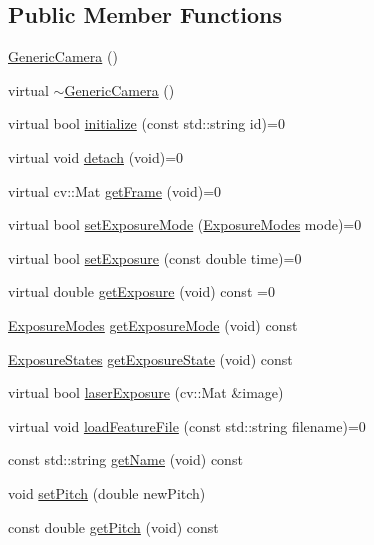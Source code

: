 \subsection*{Public Member Functions}
\begin{DoxyCompactItemize}
\item 
\hyperlink{classGenericCamera_ace942cddd443bb28aeee5e49b10aa374}{Generic\+Camera} ()
\item 
virtual \hyperlink{classGenericCamera_a8a523a465c0db18b59b6113c6d308962}{$\sim$\+Generic\+Camera} ()
\item 
virtual bool \hyperlink{classGenericCamera_ad050957bbb8003fc55f4656d43347f1e}{initialize} (const std\+::string id)=0
\item 
virtual void \hyperlink{classGenericCamera_a86a91e987d6142e5417b2c07542e0aa4}{detach} (void)=0
\item 
virtual cv\+::\+Mat \hyperlink{classGenericCamera_abeaa74ba34179da70ec2c4bbb9b0d793}{get\+Frame} (void)=0
\item 
virtual bool \hyperlink{classGenericCamera_a5c3bd3ca0d691cf9026f8c91b3cf7c66}{set\+Exposure\+Mode} (\hyperlink{constants_8h_a6e920987695b1da6e2df4e41dc867e18}{Exposure\+Modes} mode)=0
\item 
virtual bool \hyperlink{classGenericCamera_a62365678e9254bde587de4a50ffb7887}{set\+Exposure} (const double time)=0
\item 
virtual double \hyperlink{classGenericCamera_ae3fe4b50577c854037b7a77dade27487}{get\+Exposure} (void) const =0
\item 
\hyperlink{constants_8h_a6e920987695b1da6e2df4e41dc867e18}{Exposure\+Modes} \hyperlink{classGenericCamera_afdd27d857471c1bca22f10520ef28a35}{get\+Exposure\+Mode} (void) const
\item 
\hyperlink{constants_8h_ae9749bac8d6973b92725af092d0a76bc}{Exposure\+States} \hyperlink{classGenericCamera_a31369d7e310827a9ac3b4366ddcbf22e}{get\+Exposure\+State} (void) const
\item 
virtual bool \hyperlink{classGenericCamera_ad20a7c33465d6791563f77a637ceed83}{laser\+Exposure} (cv\+::\+Mat \&image)
\item 
virtual void \hyperlink{classGenericCamera_a393e01ba0b1bc18ad43f00cc62ccea4e}{load\+Feature\+File} (const std\+::string filename)=0
\item 
const std\+::string \hyperlink{classGenericCamera_a7f97060cc4089fb4d8834ce8c055a561}{get\+Name} (void) const
\item 
void \hyperlink{classGenericCamera_aae87f93ed0741bbfa4881f551cd1a73c}{set\+Pitch} (double new\+Pitch)
\item 
const double \hyperlink{classGenericCamera_a429fbb0069ed11630ba5284235563f87}{get\+Pitch} (void) const
\end{DoxyCompactItemize}
